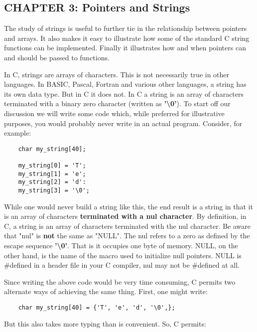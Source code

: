 \hypertarget{chapter-3-pointers-and-strings}{%
\subsection{CHAPTER 3: Pointers and
Strings}\label{chapter-3-pointers-and-strings}}

The study of strings is useful to further tie in the relationship
between pointers and arrays. It also makes it easy to illustrate how
some of the standard C string functions can be implemented. Finally it
illustrates how and when pointers can and should be passed to functions.

In C, strings are arrays of characters. This is not necessarily true in
other languages. In BASIC, Pascal, Fortran and various other languages,
a string has its own data type. But in C it does not. In C a string is
an array of characters terminated with a binary zero character (written
as \textbf{'\textbackslash0'}). To start off our discussion we will
write some code which, while preferred for illustrative purposes, you
would probably never write in an actual program. Consider, for example:

\begin{verbatim}
    char my_string[40];

    my_string[0] = 'T';
    my_string[1] = 'e';
    my_string[2] = 'd':
    my_string[3] = '\0';
\end{verbatim}

While one would never build a string like this, the end result is a
string in that it is an array of characters \textbf{terminated with a
nul character}. By definition, in C, a string is an array of characters
terminated with the nul character. Be aware that "nul" is \textbf{not}
the same as "NULL". The nul refers to a zero as defined by the escape
sequence \textbf{'\textbackslash0'}. That is it occupies one byte of
memory. NULL, on the other hand, is the name of the macro used to
initialize null pointers. NULL is \#defined in a header file in your C
compiler, nul may not be \#defined at all.

Since writing the above code would be very time consuming, C permits two
alternate ways of achieving the same thing. First, one might write:

\begin{verbatim}
    char my_string[40] = {'T', 'e', 'd', '\0',};    
\end{verbatim}

But this also takes more typing than is convenient. So, C permits:

